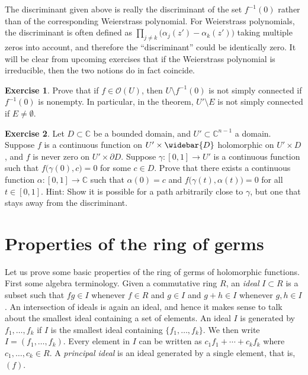 \documentclass[12pt,openany]{book}
\newcommand{\C}{{\mathbb{C}}}
\newcommand{\sO}{{\mathscr{O}}}
\newcommand{\myindex}[1]{#1\index{#1}}
\theoremstyle{plain}
\theoremstyle{remark}
\theoremstyle{definition}
\newenvironment{exbox}{%
    \def\FrameCommand{\vrule width 1pt \relax\hspace{10pt}}%
    \MakeFramed{\advance\hsize-\width\FrameRestore}%
}{%
    \endMakeFramed
}
\theoremstyle{exercise}
\newtheorem{exercise}{Exercise}[section]
\theoremstyle{example}
\begin{document}
The discriminant given above is really the discriminant of the set
$f^{-1}(0)$ rather than of the corresponding Weierstrass polynomial.
For Weierstrass polynomials, the discriminant is often defined as
$\prod_{j \not= k} \bigl( \alpha_j(z') - \alpha_k(z') \bigr)$ taking
multiple zeros into account, and therefore the ``discriminant'' could be
identically zero.  It will be clear from upcoming exercises that if
the Weierstrass polynomial is irreducible, then the two notions do in fact
coincide.

\begin{exbox}
\begin{exercise}
Prove that if $f \in \sO(U)$, then $U \setminus f^{-1}(0)$ is not simply
connected if $f^{-1}(0)$ is nonempty.  In particular, in the theorem, $U' \setminus E$ is not
simply connected if $E \not= \emptyset$.
\end{exercise}

\begin{exercise}
\pagebreak[2]
Let $D \subset \C$ be a bounded domain,
and
$U' \subset \C^{n-1}$ a domain.
Suppose
$f$ is a continuous function on
$U' \times \widebar{D}$ holomorphic on $U' \times D$,
and $f$ is never zero on
$U' \times \partial D$.
Suppose $\gamma \colon [0,1] \to U'$ is a continuous function
such that $f\bigl(\gamma(0),c\bigr) = 0$ for some $c \in D$.
Prove that there exists a continuous function $\alpha \colon [0,1] \to \C$
such that $\alpha(0) = c$ and
$f\bigl(\gamma(t),\alpha(t)\bigr) = 0$ for all $t \in [0,1]$.
Hint: Show it is possible for a path
arbitrarily close to $\gamma$, but one that stays away from
the discriminant.
\end{exercise}
\end{exbox}


\section{Properties of the ring of germs} \label{sec:propertiesofringofgerms}

Let us prove some basic properties of the
ring of germs of holomorphic functions.  First some algebra terminology.
Given a commutative ring $R$,
an \emph{\myindex{ideal}} $I \subset R$ is
a subset such that $f g \in I$ whenever $f \in R$ and $g \in I$
and $g+h \in I$ whenever $g,h \in I$.
An intersection of ideals is again an ideal, and hence it makes sense to
talk about the smallest ideal containing a set of elements.
An ideal $I$ is generated by $f_1,\ldots,f_k$
if $I$ is the smallest ideal containing $\{ f_1,\ldots,f_k \}$.  We then
%
write $I = (f_1,\ldots,f_k)$.
Every element in $I$ can be written as $c_1 f_1 + \cdots + c_k f_k$
where $c_1,\ldots,c_k \in R$.
A \emph{\myindex{principal ideal}}
is an ideal generated by a single element, that is, $(f)$.
\end{document}
